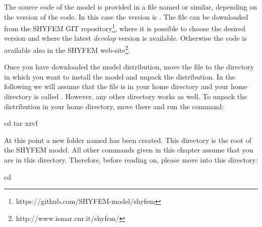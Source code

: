 
The source code of the model is provided in a file named \ttt{\shydist}
or similar, depending on the version of the code. In this case the
version is \version.  The file can be downloaded from the SHYFEM GIT
repository\footnote{https://github.com/SHYFEM-model/shyfem}, where
it is possible to choose the desired version and where the latest
\textit{develop} version is available.  Otherwise the code is available
also in the SHYFEM web-site\footnote{http://www.ismar.cnr.it/shyfem/}.

Once you have downloaded the model distribution, move the file to
the directory in which you want to install the model and unpack the
distribution. In the following we will assume that the file is in your
home directory and your home directory is called \ttt{\basedir}. However,
any other directory works as well. To unpack the distribution
in your home directory, move there and run the command:

\begin{codem}
    cd \basedir
    tar xzvf \shydist
\end{codem}

At this point a new folder named \ttt{\shydir} has been created. 
This directory is the root of the SHYFEM model. All other commands
given in this chapter assume that you are in this directory. 
Therefore, before reading on, please move into this directory:

\begin{codem}
    cd \shydir
\end{codem}

